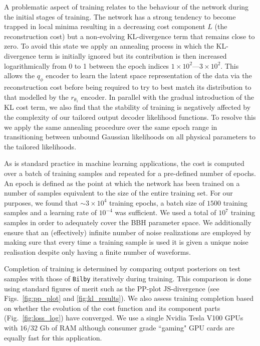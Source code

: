 \documentclass[%
showpacs,
nofootinbib,
 amsmath,amssymb,
 aps,
 twocolumn,
 prl,
 reprint,
floatfix,
]{revtex4-1}
\begin{document}
%
%
A problematic aspect of training relates to the behaviour of the network
during the initial stages of training. The network has a strong tendency to
become trapped in local minima resulting in a decreasing cost component $L$
(the reconstruction cost) but a non-evolving \ac{KL}-divergence term that
remains close to zero. To avoid this state we apply an annealing process in
which the \ac{KL}-divergence term is initially ignored but its contribution is
then increased logarithmically from 0 to 1 between the epoch indices
$1\times10^2$---$3\times10^2$. 
 This allows the $q_{\phi}$ encoder to learn the latent space
representation of the data via the reconstruction cost before being required to
try to best match its distribution to that modelled by the $r_{\theta_1}$
encoder. In parallel with the gradual introduction of the \ac{KL} cost term, we
also find that the stability of training is negatively affected by the
complexity of our tailored output decoder likelihood functions. To resolve this
we apply the same annealing procedure over the same epoch range in transitioning
between unbound Gaussian likelihoods on all physical parameters to the tailored
likelihoods. 

%
%
As is standard practice in machine learning applications, the cost is computed
over a batch of training samples and repeated for a pre-defined number of
epochs. An epoch is defined as the point at which the network has been trained 
on a number of samples equivalent to the size of the entire training set. 
For our purposes, we found that $\sim 3 \times 10^4$ training
epochs, a batch size of $1500$ training samples and a learning rate of
$10^{-4}$ was sufficient. We used a total of $10^7$ training samples in order
to adequately cover the \ac{BBH} parameter space. We additionally ensure that
an (effectively) infinite number of noise realizations are employed by making
sure that every time a training sample is used it is given a unique noise
realisation despite only having a finite number of waveforms.

%
%
Completion of training is determined by comparing output posteriors on test
samples with those of \texttt{Bilby} iteratively during training. This
comparison is done using standard figures of merit such as the \ac{PP}-plot
\ac{JS}-divergence (see Figs.~\ref{fig:pp_plot} and
\ref{fig:kl_results}). We also assess training completion based on whether the
evolution of the cost function and its component parts
(Fig.~\ref{fig:loss_log}) have converged. We use a single Nvidia Tesla V100
\acp{GPU} with $16/32$ Gb of RAM although consumer grade ``gaming" \ac{GPU}
cards are equally fast for this application.
\end{document}
